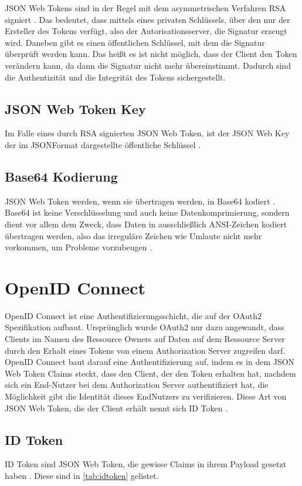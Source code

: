 JSON Web Tokens sind in der Regel mit dem asymmetrischen Verfahren \ac{RSA} signiert \citep{jwt:2015}. Das bedeutet, dass mittels eines privaten Schlüssels, über den
nur der Ersteller des Tokens verfügt, also der Autorisationsserver, die Signatur erzeugt wird.
Daneben gibt es einen öffentlichen Schlüssel, mit dem die Signatur überprüft werden kann.
Das heißt es ist nicht möglich, dass der Client den Token verändern kann, da dann die
Signatur nicht mehr übereinstimmt. Dadurch sind die Authentizität und die Integrität des
Tokens sichergestellt.

\subsection{JSON Web Token Key}
\label{sec:JSONWebToken:JSONWebTokenKey}
Im Falle eines durch RSA signierten JSON Web Token, ist der JSON Web Key der im JSONFormat dargestellte öffentliche Schlüssel \citep{jwk:2015}. 

\subsection{Base64 Kodierung}
\label{sec:JSONWebToken:Base64Kodierung}
JSON Web Token werden, wenn sie übertragen werden, in Base64 kodiert \citep{jwt:2015}. Base64 ist
keine Verschlüsselung und auch keine Datenkomprimierung, sondern dient vor allem dem
Zweck, dass Daten in ausschließlich ANSI-Zeichen kodiert übertragen werden, also das
irreguläre Zeichen wie Umlaute nicht mehr vorkommen, um Probleme vorzubeugen \citep{base64:2006}. 

\section{OpenID Connect}
\label{sec:OpenIDConnect}
OpenID Connect ist eine Authentifizierungsschicht, die auf der OAuth2 Spezifikation
aufbaut.
Ursprünglich wurde OAuth2 nur dazu angewandt, dass Clients im Namen des Ressource
Owners auf Daten auf dem Ressource Server durch den Erhalt eines Tokens von einem
Authorization Server zugreifen darf.
OpenID Connect baut darauf eine Authentifizierung auf, indem es in dem JSON Web Token
Claims steckt, dass den Client, der den Token erhalten hat, nachdem sich ein End-Nutzer bei
dem Authorization Server authentifiziert hat, die Möglichkeit gibt die Identität dieses EndNutzers zu verifizieren.
Diese Art von JSON Web Token, die der Client erhält nennt sich ID Token \citep{openidconnect:2014}. 

\subsection{ID Token}
\label{subsec:OpenIDConnect:IDToken}
ID Token sind JSON Web Token, die gewisse Claims in ihrem Payload gesetzt haben \citep{openidconnect:2014}. Diese sind in \autoref{tab:idtoken} gelistet.

